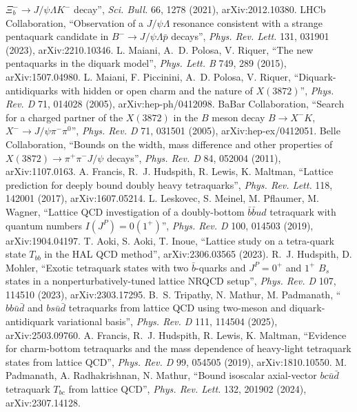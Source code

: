 $\Xi_b^-\to J/\psi\Lambda K^-$ decay'', \emph{Sci. Bull.} 66, 1278 (2021), arXiv:2012.10380.
 LHCb Collaboration, ``Observation of a $J/\psi\Lambda$ resonance consistent with a strange pentaquark candidate in
$B^-\to J/\psi\Lambda\bar p$ decays'', \emph{Phys. Rev. Lett.} 131, 031901 (2023), arXiv:2210.10346.
 L. Maiani, A.~D. Polosa, V. Riquer, ``The new pentaquarks in the diquark model'', \emph{Phys. Lett. B} 749, 289
(2015), arXiv:1507.04980.
 L. Maiani, F. Piccinini, A.~D. Polosa, V. Riquer, ``Diquark-antidiquarks with hidden or open charm and the nature of
$X(3872)$'', \emph{Phys. Rev. D} 71, 014028 (2005), arXiv:hep-ph/0412098.
 BaBar Collaboration, ``Search for a charged partner of the $X(3872)$ in the $B$ meson decay $B\to X^-K$,
$X^-\to J/\psi\pi^-\pi^0$'', \emph{Phys. Rev. D} 71, 031501 (2005), arXiv:hep-ex/0412051.
 Belle Collaboration, ``Bounds on the width, mass difference and other properties of $X(3872)\to\pi^+\pi^-J/\psi$
decays'', \emph{Phys. Rev. D} 84, 052004 (2011), arXiv:1107.0163.
 A. Francis, R.~J. Hudspith, R. Lewis, K. Maltman, ``Lattice prediction for deeply bound doubly heavy tetraquarks'',
\emph{Phys. Rev. Lett.} 118, 142001 (2017), arXiv:1607.05214.
 L. Leskovec, S. Meinel, M. Pflaumer, M. Wagner, ``Lattice QCD investigation of a doubly-bottom $\bar b\bar bud$
tetraquark with quantum numbers $I(J^P)=0(1^+)$'', \emph{Phys. Rev. D} 100, 014503 (2019), arXiv:1904.04197.
 T. Aoki, S. Aoki, T. Inoue, ``Lattice study on a tetra-quark state $T_{bb}$ in the HAL QCD method'',
arXiv:2306.03565 (2023).
 R.~J. Hudspith, D. Mohler, ``Exotic tetraquark states with two $\bar b$-quarks and $J^P=0^+$ and $1^+$ $B_s$
states in a nonperturbatively-tuned lattice NRQCD setup'', \emph{Phys. Rev. D} 107, 114510 (2023), arXiv:2303.17295.
 B.~S. Tripathy, N. Mathur, M. Padmanath, ``$bb\bar u\bar d$ and $bs\bar u\bar d$ tetraquarks from lattice QCD using
two-meson and diquark-antidiquark variational basis'', \emph{Phys. Rev. D} 111, 114504 (2025), arXiv:2503.09760.
 A. Francis, R.~J. Hudspith, R. Lewis, K. Maltman, ``Evidence for charm-bottom tetraquarks and the mass dependence
of heavy-light tetraquark states from lattice QCD'', \emph{Phys. Rev. D} 99, 054505 (2019), arXiv:1810.10550.
 M. Padmanath, A. Radhakrishnan, N. Mathur, ``Bound isoscalar axial-vector $bc\bar u\bar d$ tetraquark $T_{bc}$
from lattice QCD'', \emph{Phys. Rev. Lett.} 132, 201902 (2024), arXiv:2307.14128.
